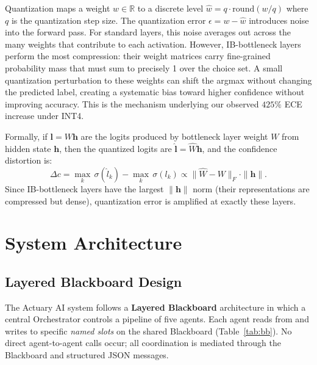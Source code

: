 \documentclass[conference]{IEEEtran}
\begin{document}
Quantization maps a weight $w\in\mathbb{R}$ to a discrete level
$\hat{w} = q\cdot\mathrm{round}(w/q)$ where $q$ is the quantization
step size. The quantization error $\epsilon = w - \hat{w}$ introduces
noise into the forward pass. For standard layers, this noise averages
out across the many weights that contribute to each activation.
However, IB-bottleneck layers perform the most compression: their
weight matrices carry fine-grained probability mass that must sum to
precisely 1 over the choice set. A small quantization perturbation
to these weights can shift the argmax without changing the predicted
label, creating a systematic bias toward higher confidence
without improving accuracy. This is the mechanism underlying our
observed $425\%$ ECE increase under INT4.

Formally, if $\mathbf{l} = W\mathbf{h}$ are the logits produced by
bottleneck layer weight $W$ from hidden state $\mathbf{h}$, then
the quantized logits are $\hat{\mathbf{l}} = \hat{W}\mathbf{h}$,
and the confidence distortion is:
\begin{equation}
    \Delta c = \max_k\,\sigma(\hat{l}_k) - \max_k\,\sigma(l_k) \propto
    \|\hat{W}-W\|_F \cdot \|\mathbf{h}\|.
    \label{eq:quant_distortion}
\end{equation}
Since IB-bottleneck layers have the largest $\|\mathbf{h}\|$ norm
(their representations are compressed but dense), quantization error
is amplified at exactly these layers.

\section{System Architecture}
\label{sec:system}

\subsection{Layered Blackboard Design}

The Actuary AI system follows a \textbf{Layered Blackboard}
architecture in which a central Orchestrator controls a pipeline of
five agents. Each agent reads from and writes to specific
\emph{named slots} on the shared Blackboard (Table~\ref{tab:bb}).
No direct agent-to-agent calls occur; all coordination is mediated
through the Blackboard and structured JSON messages.
\end{document}
